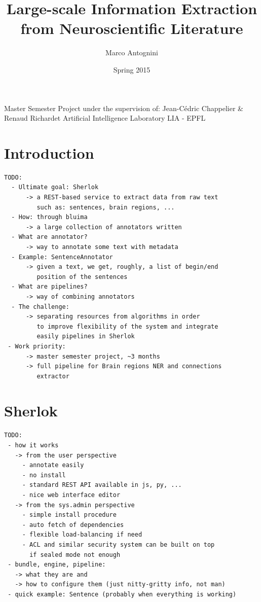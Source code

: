 \documentclass{article}
\title{Large-scale Information Extraction from Neuroscientific Literature}
\date{Spring 2015}
\author{Marco Antognini}
\begin{document}
\maketitle

Master Semester Project under the supervision of:
Jean-Cédric Chappelier \& 
Renaud Richardet
Artificial Intelligence Laboratory LIA - EPFL

\newpage
{}


\tableofcontents
\newpage

\section{Introduction}

\begin{verbatim}
TODO:
  - Ultimate goal: Sherlok
      -> a REST-based service to extract data from raw text
         such as: sentences, brain regions, ...
  - How: through bluima
      -> a large collection of annotators written
  - What are annotator?
      -> way to annotate some text with metadata
  - Example: SentenceAnnotator
      -> given a text, we get, roughly, a list of begin/end 
         position of the sentences
  - What are pipelines?
      -> way of combining annotators
  - The challenge:
      -> separating resources from algorithms in order
         to improve flexibility of the system and integrate
         easily pipelines in Sherlok
 - Work priority:
      -> master semester project, ~3 months
      -> full pipeline for Brain regions NER and connections 
         extractor
\end{verbatim}

\section{Sherlok}

\begin{verbatim}
TODO:
 - how it works
   -> from the user perspective
     - annotate easily
     - no install
     - standard REST API available in js, py, ...
     - nice web interface editor
   -> from the sys.admin perspective
     - simple install procedure
     - auto fetch of dependencies
     - flexible load-balancing if need
     - ACL and similar security system can be built on top
       if sealed mode not enough
 - bundle, engine, pipeline:
   -> what they are and
   -> how to configure them (just nitty-gritty info, not man)
 - quick example: Sentence (probably when everything is working)
\end{verbatim}
\end{document}
